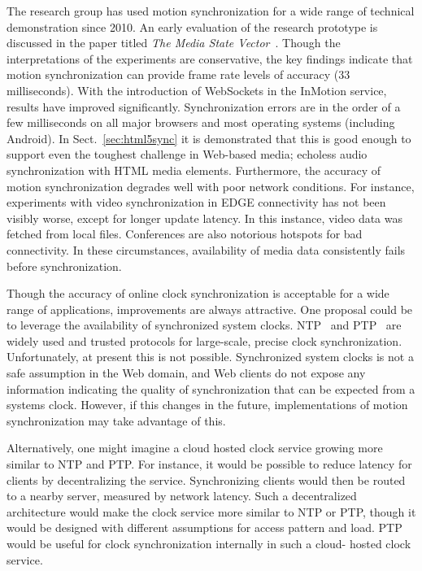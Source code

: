The research group has used motion synchronization for a wide range of
technical demonstration since 2010. An early evaluation of the research
prototype is discussed in the paper titled \emph{The Media State
Vector}~\cite{msv}. Though the interpretations of the experiments are
conservative, the key findings indicate that motion synchronization can
provide frame rate levels of accuracy (33 milliseconds). With the introduction
of WebSockets in the InMotion service, results have improved significantly.
Synchronization errors are in the order of a few milliseconds on all major
browsers and most operating systems (including Android). In
Sect.~\ref{sec:html5sync} it is demonstrated that this is good enough to
support even the toughest challenge in Web-based media; echoless audio
synchronization with HTML media elements. Furthermore, the accuracy of motion
synchronization degrades well with poor network conditions. For instance,
experiments with video synchronization in EDGE connectivity has not been
visibly worse, except for longer update latency. In this instance, video data
was fetched from local files. Conferences are also notorious hotspots for bad
connectivity. In these circumstances, availability of media data consistently
fails before synchronization.



Though the accuracy of online clock synchronization is acceptable for a wide
range of applications, improvements are always attractive. One proposal could
be to leverage the availability of synchronized system clocks. NTP~\cite{ntp}
and PTP~\cite{ptp} are widely used and trusted protocols for large-scale,
precise clock synchronization. Unfortunately, at present this is not possible.
Synchronized system clocks is not a safe assumption in the Web domain, and Web
clients do not expose any information indicating the quality of
synchronization that can be expected from a systems clock. However, if this
changes in the future, implementations of motion synchronization may take
advantage of this.

Alternatively, one might imagine a cloud hosted clock service growing more
similar to NTP and PTP. For instance, it would be possible to reduce latency
for clients by decentralizing the service. Synchronizing clients would then be
routed to a nearby server, measured by network latency. Such a decentralized
architecture would make the clock service more similar to NTP or PTP, though
it would be designed with different assumptions for access pattern and load.
PTP would be useful for clock synchronization internally in such a cloud-
hosted clock service.

